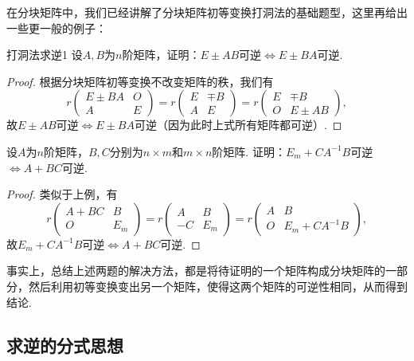 在分块矩阵中，我们已经讲解了分块矩阵初等变换打洞法的基础题型，这里再给出一些更一般的例子：
\begin{example}{}{打洞法求逆1}
    设$A,B$为$n$阶矩阵，证明：$E\pm AB$可逆$\iff E\pm BA$可逆.
\end{example}

\begin{proof}
    根据分块矩阵初等变换不改变矩阵的秩，我们有
    \[r\begin{pmatrix}
            E\pm BA & O \\ A & E
        \end{pmatrix}=r\begin{pmatrix}
            E & \mp B \\ A & E
        \end{pmatrix}=r\begin{pmatrix}
            E & \mp B \\ O & E\pm AB
        \end{pmatrix},\]
    故$E\pm AB$可逆$\iff E\pm BA$可逆（因为此时上式所有矩阵都可逆）.
\end{proof}

\begin{example}{}{}
    设$A$为$n$阶矩阵，$B,C$分别为$n \times m$和$m \times n$阶矩阵. 证明：$E_m+CA^{-1}B$可逆$\iff A+BC$可逆.
\end{example}

\begin{proof}
    类似于上例，有
    \[r\begin{pmatrix}
            A+BC & B \\ O & E_m
        \end{pmatrix}=r\begin{pmatrix}
            A & B \\ -C & E_m
        \end{pmatrix}=r\begin{pmatrix}
            A & B \\ O & E_m+CA^{-1}B
        \end{pmatrix},\]
    故$E_m+CA^{-1}B$可逆$\iff A+BC$可逆.
\end{proof}

事实上，总结上述两题的解决方法，都是将待证明的一个矩阵构成分块矩阵的一部分，然后利用初等变换变出另一个矩阵，使得这两个矩阵的可逆性相同，从而得到结论.

\subsection{求逆的分式思想}

